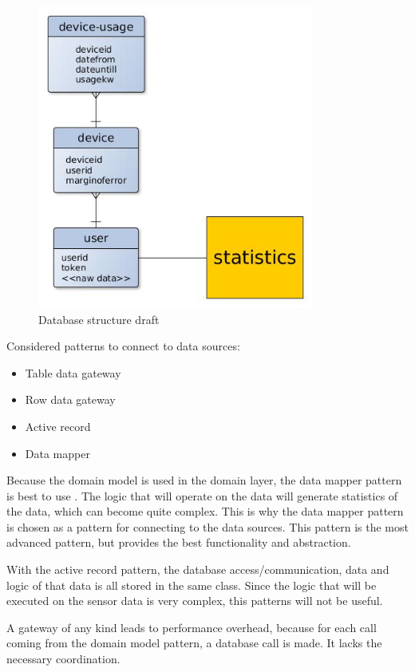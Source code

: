 \begin{figure}[H]
\caption{Database structure draft}
\centering
\includegraphics[height=10cm]{4-analysis/images/SoftwarePatternsDatabaseDraft.jpg}
\end{figure}

Considered patterns to connect to data sources:
\begin{itemize}
\item Table data gateway%
\item Row data gateway%
\item Active record %
\item Data mapper%
\end{itemize}

Because the domain model is used in the domain layer, the data mapper pattern is best to use . 
The logic that will operate on the data will generate statistics of the data, which can become quite complex. This is why the data mapper pattern is chosen as a pattern for connecting to the data sources. This pattern is the most advanced pattern, but provides the best functionality and abstraction.

With the active record pattern, the database access/communication, data and logic of that data is all stored in the same class. Since the logic that will be executed on the sensor data is very complex, this patterns will not be useful.

A gateway of any kind leads to performance overhead, because for each call coming from the domain model pattern, a database call is made. It lacks the necessary coordination.
%
%
%



